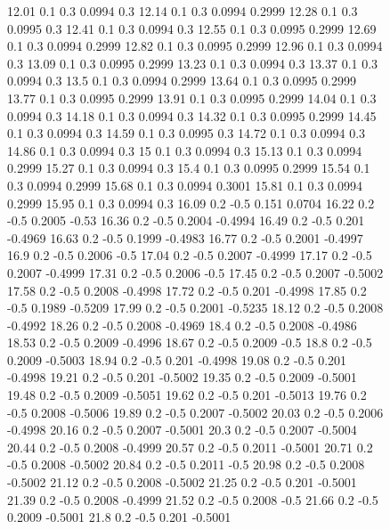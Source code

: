 \documentclass[
    12pt,
    oneside,
    a4paper,
    chapter=TITLE,
    section=TITLE,
    english,
    brazil
]{abntex2}
\begin{document}
\begin{figure}[H]
{        12.01 0.1 0.3 0.0994 0.3
        12.14 0.1 0.3 0.0994 0.2999
        12.28 0.1 0.3 0.0995 0.3
        12.41 0.1 0.3 0.0994 0.3
        12.55 0.1 0.3 0.0995 0.2999
        12.69 0.1 0.3 0.0994 0.2999
        12.82 0.1 0.3 0.0995 0.2999
        12.96 0.1 0.3 0.0994 0.3
        13.09 0.1 0.3 0.0995 0.2999
        13.23 0.1 0.3 0.0994 0.3
        13.37 0.1 0.3 0.0994 0.3
        13.5 0.1 0.3 0.0994 0.2999
        13.64 0.1 0.3 0.0995 0.2999
        13.77 0.1 0.3 0.0995 0.2999
        13.91 0.1 0.3 0.0995 0.2999
        14.04 0.1 0.3 0.0994 0.3
        14.18 0.1 0.3 0.0994 0.3
        14.32 0.1 0.3 0.0995 0.2999
        14.45 0.1 0.3 0.0994 0.3
        14.59 0.1 0.3 0.0995 0.3
        14.72 0.1 0.3 0.0994 0.3
        14.86 0.1 0.3 0.0994 0.3
        15 0.1 0.3 0.0994 0.3
        15.13 0.1 0.3 0.0994 0.2999
        15.27 0.1 0.3 0.0994 0.3
        15.4 0.1 0.3 0.0995 0.2999
        15.54 0.1 0.3 0.0994 0.2999
        15.68 0.1 0.3 0.0994 0.3001
        15.81 0.1 0.3 0.0994 0.2999
        15.95 0.1 0.3 0.0994 0.3
        16.09 0.2 -0.5 0.151 0.0704
        16.22 0.2 -0.5 0.2005 -0.53
        16.36 0.2 -0.5 0.2004 -0.4994
        16.49 0.2 -0.5 0.201 -0.4969
        16.63 0.2 -0.5 0.1999 -0.4983
        16.77 0.2 -0.5 0.2001 -0.4997
        16.9 0.2 -0.5 0.2006 -0.5
        17.04 0.2 -0.5 0.2007 -0.4999
        17.17 0.2 -0.5 0.2007 -0.4999
        17.31 0.2 -0.5 0.2006 -0.5
        17.45 0.2 -0.5 0.2007 -0.5002
        17.58 0.2 -0.5 0.2008 -0.4998
        17.72 0.2 -0.5 0.201 -0.4998
        17.85 0.2 -0.5 0.1989 -0.5209
        17.99 0.2 -0.5 0.2001 -0.5235
        18.12 0.2 -0.5 0.2008 -0.4992
        18.26 0.2 -0.5 0.2008 -0.4969
        18.4 0.2 -0.5 0.2008 -0.4986
        18.53 0.2 -0.5 0.2009 -0.4996
        18.67 0.2 -0.5 0.2009 -0.5
        18.8 0.2 -0.5 0.2009 -0.5003
        18.94 0.2 -0.5 0.201 -0.4998
        19.08 0.2 -0.5 0.201 -0.4998
        19.21 0.2 -0.5 0.201 -0.5002
        19.35 0.2 -0.5 0.2009 -0.5001
        19.48 0.2 -0.5 0.2009 -0.5051
        19.62 0.2 -0.5 0.201 -0.5013
        19.76 0.2 -0.5 0.2008 -0.5006
        19.89 0.2 -0.5 0.2007 -0.5002
        20.03 0.2 -0.5 0.2006 -0.4998
        20.16 0.2 -0.5 0.2007 -0.5001
        20.3 0.2 -0.5 0.2007 -0.5004
        20.44 0.2 -0.5 0.2008 -0.4999
        20.57 0.2 -0.5 0.2011 -0.5001
        20.71 0.2 -0.5 0.2008 -0.5002
        20.84 0.2 -0.5 0.2011 -0.5
        20.98 0.2 -0.5 0.2008 -0.5002
        21.12 0.2 -0.5 0.2008 -0.5002
        21.25 0.2 -0.5 0.201 -0.5001
        21.39 0.2 -0.5 0.2008 -0.4999
        21.52 0.2 -0.5 0.2008 -0.5
        21.66 0.2 -0.5 0.2009 -0.5001
        21.8 0.2 -0.5 0.201 -0.5001
}
\end{figure}
\end{document}
